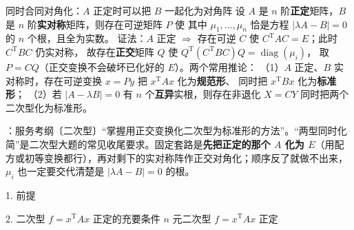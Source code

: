 \begin{fdeep}{同时合同对角化：$A$ 正定时可以把 $B$ 一起化为对角阵}
设 $A$ 是 $n$ 阶\textbf{正定}矩阵，$B$ 是 $n$ 阶\textbf{实对称}矩阵，则存在可逆矩阵 $P$ 使
其中 $\mu_1,\dots,\mu_n$ 恰是方程 $|\lambda A-B|=0$ 的 $n$ 个根，且全为实数。
证法：$A$ 正定 $\Longrightarrow$ 存在可逆 $C$ 使 $C^{\mathrm T}AC=E$；此时 $C^{\mathrm T}BC$ 仍实对称，
故存在\textbf{正交}矩阵 $Q$ 使 $Q^{\mathrm T}(C^{\mathrm T}BC)Q=\operatorname{diag}(\mu_i)$，
取 $P=CQ$（正交变换不会破坏已化好的 $E$）。两个常用推论：
（1）$A$ 正定、$B$ 实对称时，存在可逆变换 $x=Py$ 把 $x^{\mathrm T}Ax$ 化为\textbf{规范形}、
同时把 $x^{\mathrm T}Bx$ 化为\textbf{标准形}；
（2）若 $|A-\lambda B|=0$ 有 $n$ 个\textbf{互异}实根，则存在非退化 $X=CY$ 同时把两个二次型化为标准形。

\fbref{}：服务考纲〔二次型〕“掌握用正交变换化二次型为标准形的方法”。“两型同时化简”是二次型大题的常见收尾要求。固定套路是\textbf{先把正定的那个 $A$ 化为 $E$}（用配方或初等变换都行），再对剩下的实对称阵作正交对角化；顺序反了就做不出来，$\mu_i$ 也一定要交代清楚是 $|\lambda A-B|=0$ 的根。
\end{fdeep}


\begin{fcard}{1. 前提}
\end{fcard}


\begin{fcard}{2. 二次型 $f=x^{\mathrm{T}}Ax$ 正定的充要条件}
$n$ 元二次型 $f=x^{\mathrm{T}}Ax$ 正定
\end{fcard}

